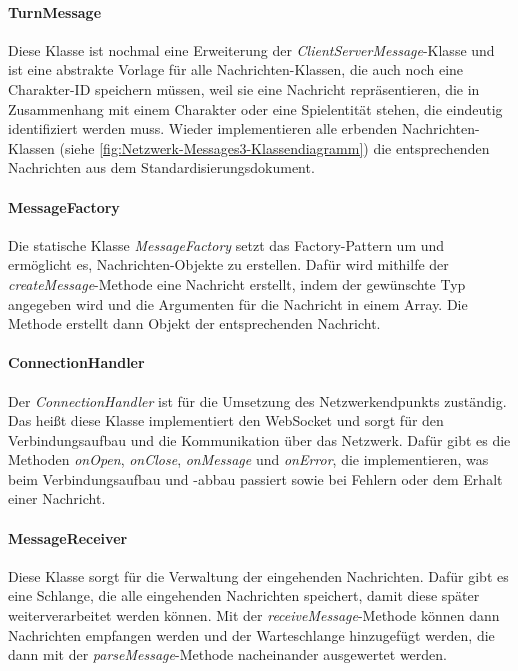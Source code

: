 \documentclass[12pt]{article}
\newcommand{\class}[1]{\textit{#1}-Klasse}
\newcommand{\method}[1]{\textit{#1}-Methode}
\newcounter{fa}
\begin{document}
\paragraph{TurnMessage}
Diese Klasse ist nochmal eine Erweiterung der \class{ClientServerMessage} und ist eine abstrakte Vorlage für alle Nachrichten-Klassen, die auch noch eine Charakter-ID speichern müssen, weil sie eine Nachricht repräsentieren, die in Zusammenhang mit einem Charakter oder eine Spielentität stehen, die eindeutig identifiziert werden muss. Wieder implementieren alle erbenden Nachrichten-Klassen (siehe \autoref{fig:Netzwerk-Messages3-Klassendiagramm}) die entsprechenden Nachrichten aus dem Standardisierungsdokument.

\paragraph{MessageFactory}
Die statische Klasse \textit{MessageFactory} setzt das Factory-Pattern um und ermöglicht es, Nachrichten-Objekte zu erstellen. Dafür wird mithilfe der \method{createMessage} eine Nachricht erstellt, indem der gewünschte Typ angegeben wird und die Argumenten für die Nachricht in einem Array. Die Methode erstellt dann Objekt der entsprechenden Nachricht. 

\paragraph{ConnectionHandler}
Der \textit{ConnectionHandler} ist für die Umsetzung des Netzwerkendpunkts zuständig. Das heißt diese Klasse implementiert den WebSocket und sorgt für den Verbindungsaufbau und die Kommunikation über das Netzwerk. Dafür gibt es die Methoden \textit{onOpen}, \textit{onClose}, \textit{onMessage} und \textit{onError}, die implementieren, was beim Verbindungsaufbau und -abbau passiert sowie bei Fehlern oder dem Erhalt einer Nachricht. 

\paragraph{MessageReceiver}
Diese Klasse sorgt für die Verwaltung der eingehenden Nachrichten. Dafür gibt es eine Schlange, die alle eingehenden Nachrichten speichert, damit diese später weiterverarbeitet werden können. Mit der \method{receiveMessage} können dann Nachrichten \glqq empfangen\grqq{} werden und der Warteschlange hinzugefügt werden, die dann mit der \method{parseMessage} nacheinander ausgewertet werden. 
\end{document}
